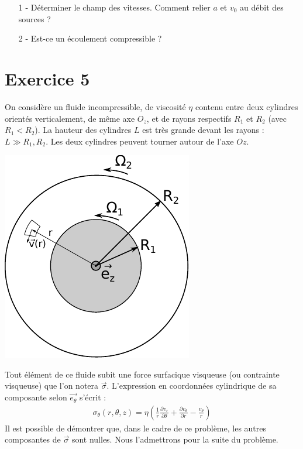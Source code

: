 \documentclass{report}
\begin{document}
\begin{itemize}
	\item[1 - ] Déterminer le champ des vitesses. Comment relier $a$ et $v_0$ au débit des sources ? 
	\item[2 - ] Est-ce un écoulement compressible ?
\end{itemize}

\newpage

\section*{Exercice 5}

On considère un fluide incompressible, de viscosité $\eta$ contenu entre deux cylindres orientés verticalement, de même axe $O_z$, et de rayons respectifs $R_1$ et $R_2$ (avec $R_1<R_2$). La hauteur des cylindres $L$ est très grande devant les rayons : $L\gg R_1, R_2$. Les deux cylindres peuvent tourner autour de l'axe $Oz$. 

\begin{center}
	\includegraphics[scale=0.8]{meca_flu3.pdf}
\end{center}

Tout élément de ce fluide subit une force surfacique visqueuse (ou contrainte visqueuse) que l'on notera $\vec{\sigma}$. L'expression en coordonnées cylindrique de sa composante selon $\vec{e_\theta}$ s'écrit : 
\begin{align*}
	\sigma_\theta(r,\theta,z)=\eta\left(\frac{1}{r}\frac{\partial v_r}{\partial \theta}+ \frac{\partial v_\theta}{\partial r} - \frac{v_\theta}{r} \right)
\end{align*}
Il est possible de démontrer que, dans le cadre de ce problème, les autres composantes de $\vec{\sigma}$ sont nulles. Nous l'admettrons pour la suite du problème. 
\end{document}
